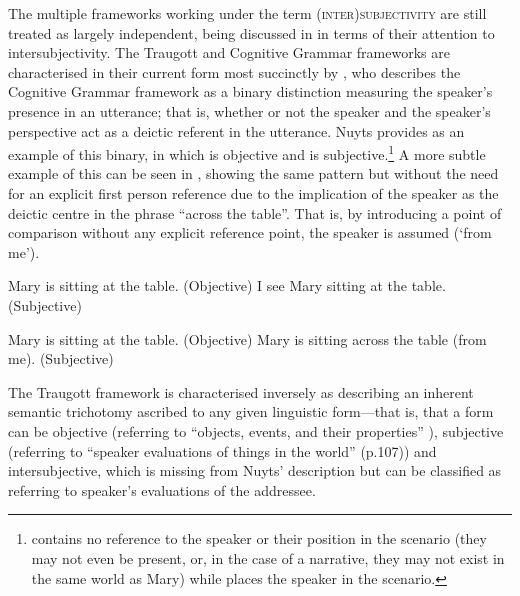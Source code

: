 The multiple frameworks working under the term \textsc{(inter)subjectivity} are still treated as largely independent, being discussed in  in terms of their attention to intersubjectivity. The Traugott and Cognitive Grammar frameworks are characterised in their current form most succinctly by , who describes the Cognitive Grammar framework as a binary distinction measuring the speaker's presence in an utterance; that is, whether or not the speaker and the speaker's perspective act as a deictic referent in the utterance. Nuyts provides  as an example of this binary, in which  is objective and  is subjective.\footnote{ contains no reference to the speaker or their position in the scenario (they may not even be present, or, in the case of a narrative, they may not exist in the same world as Mary) while  places the speaker in the scenario.} A more subtle example of this can be seen in , showing the same pattern but without the need for an explicit first person reference due to the implication of the speaker as the deictic centre in the phrase ``across the table''. That is, by introducing a point of comparison without any explicit reference point, the speaker is assumed (`from me').

\begin{exe}
\ex\label{ex:LangackerNuyts1}
\begin{xlist}
\ex Mary is sitting at the table. (Objective)\label{ex:LangackerNuyts1:Obj}
\ex I see Mary sitting at the table. (Subjective)\label{ex:LangackerNuyts1:Subj}
\end{xlist}
\cite[107]{Nuyts2015}
\end{exe}

\begin{exe}
\ex\label{ex:MyLangackerNuyts}
\begin{xlist}
\ex Mary is sitting at the table. (Objective)
\ex Mary is sitting across the table (from me). (Subjective)
\end{xlist}
\end{exe}

The Traugott framework is characterised inversely as describing an inherent semantic trichotomy ascribed to any given linguistic form---that is, that a form can be objective (referring to ``objects, events, and their properties'' \cite[107]{Nuyts2015}), subjective (referring to ``speaker evaluations of things in the world'' (p.107)) and intersubjective, which is missing from Nuyts' description but can be classified as referring to speaker's evaluations of the addressee.

